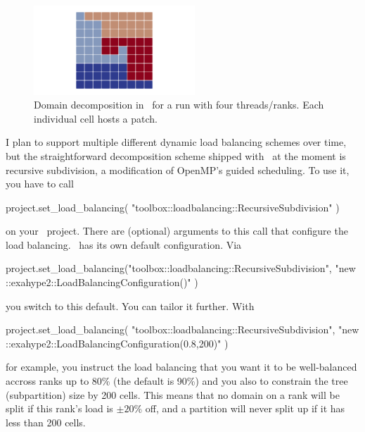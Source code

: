 \begin{figure}
 \begin{center}
  \includegraphics[width=0.54\textwidth]{60_exahype/domain-decomposition.png}
 \end{center}
 \caption{
  Domain decomposition in \ExaHyPE\ for a run with four threads/ranks. Each
  individual cell hosts a patch.
 }
\end{figure}


I plan to support multiple different dynamic load balancing schemes over time,
but the straightforward decomposition scheme shipped with \Peano\ at the moment
is recursive subdivision, a modification of OpenMP's guided scheduling.
To use it, you have to call
\begin{code}
project.set_load_balancing( "toolbox::loadbalancing::RecursiveSubdivision" )
\end{code}

\noindent
on your \ExaHyPE\ project. There are (optional) arguments to this call that
configure the load balancing.
\ExaHyPE\ has its own default configuration. 
Via

\begin{code}
project.set_load_balancing("toolbox::loadbalancing::RecursiveSubdivision", 
 "new ::exahype2::LoadBalancingConfiguration()" )
\end{code}

\noindent
you switch to this default.
You can tailor it further.
With

\begin{code}
project.set_load_balancing(
 "toolbox::loadbalancing::RecursiveSubdivision", 
 "new ::exahype2::LoadBalancingConfiguration(0.8,200)" )
\end{code}

\noindent
for example, you instruct the load balancing that you want it to be well-balanced 
accross ranks up to 80\% (the default is 90\%) and you also to constrain the tree (subpartition) size 
by 200 cells.
This means that no domain on a rank will be split if this rank's load is $\pm20\%$ off, and a partition
will never split up if it has less than 200 cells.

